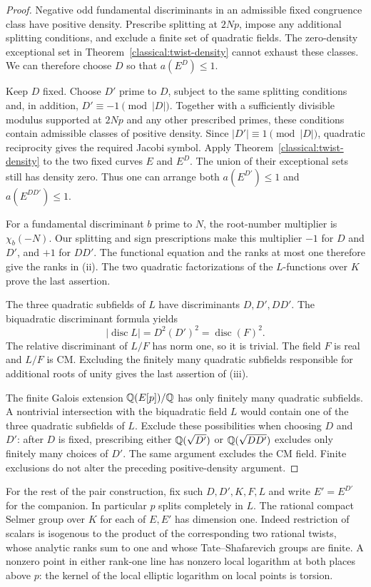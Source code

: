 \begin{proof}
Negative odd fundamental discriminants in an admissible fixed
congruence class have positive density. Prescribe splitting at
$2Np$, impose any additional splitting conditions, and exclude a
finite set of quadratic fields. The zero-density exceptional set
in Theorem~\ref{classical:twist-density} cannot exhaust these classes.
We can therefore choose $D$ so that $a(E^D)\leq1$.

Keep $D$ fixed. Choose $D'$ prime to $D$, subject to the same
splitting conditions and, in addition,
$D'\equiv-1\pmod{|D|}$. Together with a sufficiently divisible
modulus supported at $2Np$ and any other prescribed primes, these
conditions contain admissible classes of positive density. Since
$|D'|\equiv1\pmod{|D|}$, quadratic reciprocity gives the required
Jacobi symbol. Apply Theorem~\ref{classical:twist-density} to the
two fixed curves $E$ and $E^D$. The union of their exceptional sets
still has density zero. Thus one can arrange both
$a(E^{D'})\leq1$ and $a(E^{DD'})\leq1$.

For a fundamental discriminant $b$ prime to $N$, the root-number
multiplier is $\chi_b(-N)$. Our splitting and sign prescriptions
make this multiplier $-1$ for $D$ and $D'$, and $+1$ for $DD'$.
The functional equation and the ranks at most one therefore give
the ranks in (ii). The two quadratic factorizations of the
$L$-functions over $K$ prove the last assertion.

The three quadratic subfields of $L$ have discriminants $D,D',DD'$.
The biquadratic discriminant formula yields
\[
 |\operatorname{disc}L|=D^2(D')^2
                       =\operatorname{disc}(F)^2.
\]
The relative discriminant of $L/F$ has norm one, so it is trivial.
The field $F$ is real and $L/F$ is CM. Excluding the finitely many
quadratic subfields responsible for additional roots of unity gives
the last assertion of (iii).

The finite Galois extension $\mathbb Q(E[p])/\mathbb Q$ has only finitely many
quadratic subfields. A nontrivial intersection with the biquadratic
field $L$ would contain one of the three quadratic subfields of
$L$. Exclude these possibilities when choosing $D$ and $D'$:
after $D$ is fixed, prescribing either $\mathbb Q(\sqrt{D'})$ or
$\mathbb Q(\sqrt{DD'})$ excludes only finitely many choices of $D'$.
The same argument excludes the CM field. Finite exclusions do not
alter the preceding positive-density argument.
\end{proof}

For the rest of the pair construction, fix such $D,D',K,F,L$ and
write $E'=E^{D'}$ for the companion. In particular $p$ splits
completely in $L$. The rational compact Selmer group over $K$ for
each of $E,E'$ has dimension one. Indeed restriction of scalars is
isogenous to the product of the corresponding two rational twists,
whose analytic ranks sum to one and whose Tate--Shafarevich groups
are finite. A nonzero point in either rank-one line has nonzero
local logarithm at both places above $p$: the kernel of the local
elliptic logarithm on local points is torsion.

